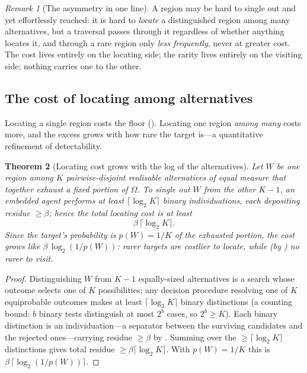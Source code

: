 \documentclass[11pt,a4paper]{article}
\theoremstyle{thmstyle}
\newtheorem{theorem}{Theorem}[section]
\theoremstyle{definition}
\theoremstyle{remark}
\newtheorem{remark}[theorem]{Remark}
\newcommand{\Space}{\Omega}
\newcommand{\thick}{\beta}
\begin{document}
\begin{remark}[The asymmetry in one line]
\label{rem:needle}
A region may be hard to single out and yet effortlessly reached: it is hard to
\emph{locate} a distinguished region among many alternatives, but a traversal
passes through it regardless of whether anything locates it, and through a rare
region only \emph{less frequently}, never at greater cost. The cost lives entirely
on the locating side; the rarity lives entirely on the visiting side; nothing
carries one to the other.
\end{remark}

\subsection{The cost of locating among alternatives}

Locating a single region costs the floor (). Locating one
region \emph{among many} costs more, and the excess grows with how rare the target
is---a quantitative refinement of detectability.

\begin{theorem}[Locating cost grows with the log of the alternatives]
\label{thm:locating-cost}
Let $W$ be one region among $K$ pairwise-disjoint realisable alternatives of equal
measure that together exhaust a fixed portion of $\Space$. To single out $W$ from
the other $K-1$, an embedded agent performs at least $\lceil\log_2 K\rceil$ binary
individuations, each depositing residue $\ge\thick$; hence the total locating cost
is at least
\[
\thick\,\lceil\log_2 K\rceil .
\]
Since the target's probability is $p(W)=1/K$ of the exhausted portion, the cost
grows like $\thick\,\log_2(1/p(W))$: rarer targets are costlier to locate, while
\textup{(}by \textup{)} no rarer to visit.
\end{theorem}

\begin{proof}
Distinguishing $W$ from $K-1$ equally-sized alternatives is a search whose outcome
selects one of $K$ possibilities; any decision procedure resolving one of $K$
equiprobable outcomes makes at least $\lceil\log_2 K\rceil$ binary distinctions
(a counting bound: $b$ binary tests distinguish at most $2^{b}$ cases, so
$2^{b}\ge K$). Each binary distinction is an individuation---a separator between
the surviving candidates and the rejected ones---carrying residue $\ge\thick$ by
. Summing over the $\ge\lceil\log_2 K\rceil$ distinctions
gives total residue $\ge\thick\lceil\log_2 K\rceil$. With $p(W)=1/K$ this is
$\thick\,\lceil\log_2(1/p(W))\rceil$.
\end{proof}
\end{document}
